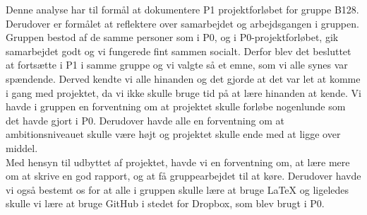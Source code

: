 Denne analyse har til formål at dokumentere P1 projektforløbet for gruppe B128. Derudover er formålet at reflektere over samarbejdet og arbejdsgangen i gruppen.
\\
Gruppen bestod af de samme personer som i P0, og i P0-projektforløbet, gik samarbejdet godt og vi fungerede fint sammen socialt. Derfor blev det besluttet at fortsætte i P1 i samme gruppe og vi valgte så et emne, som vi alle synes var spændende. Derved kendte vi alle hinanden og det gjorde at det var let at komme i gang med projektet, da vi ikke skulle bruge tid på at lære hinanden at kende. Vi havde i gruppen en forventning om at projektet skulle forløbe nogenlunde som det havde gjort i P0. Derudover havde alle en forventning om at ambitionsniveauet skulle være højt og projektet skulle ende med at ligge over middel. 
\\
Med hensyn til udbyttet af projektet, havde vi en forventning om, at lære mere om at skrive en god rapport, og at få gruppearbejdet til at køre. Derudover havde vi også bestemt os for at alle i gruppen skulle lære at bruge \LaTeX{} og ligeledes skulle vi lære at bruge GitHub i stedet for Dropbox, som blev brugt i P0.  

